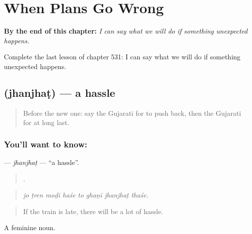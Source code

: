 
\chapter{When Plans Go Wrong}
\label{ch:gu-when-plans-go-wrong}

\begin{chapteropening}
\textbf{By the end of this chapter:} \emph{I can say what we will do if something unexpected happens.}

Complete the last lesson of chapter 531: I can say what we will do if something unexpected happens.
\end{chapteropening}

\section[\texorpdfstring{\gu{ઝંઝટ} (jhanjhaṭ)}{ઝંઝટ (jhanjhaṭ)}]{ (jhanjhaṭ) — a hassle}

\label{lesson:GU-C531-jhanjhat}



\begin{quote}
Before the new one: say the Gujarati for to push back, then the Gujarati for at long last.
\end{quote}

\subsection*{You'll want to know: }
\textbf{} — \emph{jhanjhaṭ} — \textquotedblleft{}a hassle\textquotedblright{}.

\begin{quote}
       .
\end{quote}

\begin{quote}
\emph{jo ṭren moḍī haśe to ghaṇī jhanjhaṭ thaśe.}
\end{quote}

\begin{quote}
If the train is late, there will be a lot of hassle.
\end{quote}

A feminine noun.

